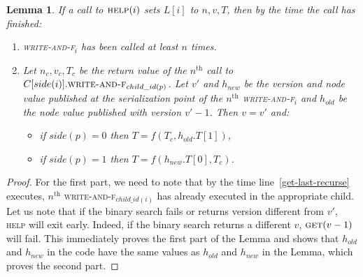 \documentclass[a4paper,11pt]{article}
\newtheorem{lemma}{Lemma}
\newcommand{\fn}[1]{\textsc{#1}}
\begin{document}
\begin{lemma}
	If a call to $\fn{help}(i)$ sets $L[i]$ to $n, v, T$, then by the time the call has finished: \label{last-is-correct}
\begin{enumerate}
	\item \fn{write-and-f$_i$} has been called at least $n$ times.
	\item Let $n_c, v_c, T_c$ be the return value of the $n^{\text{th}}$ call to $C[side(i)].\fn{write-and-f}_{child\_id(p)}$. Let $v'$ and $h_{new}$ be the version and node value published at the serialization point of the $n^{\text{th}}$
		\fn{write-and-f$_i$} and $h_{old}$ be the node value published with version $v'-1$. Then $v = v'$ and:
		\begin{itemize}
			\item if $side(p) = 0$ then $T = f(T_c, h_{old}.T[1])$,
			\item if $side(p) = 1$ then $T = f(h_{new}.T[0], T_c)$.
		\end{itemize}
\end{enumerate}
\end{lemma}
\begin{proof}
	For the first part, we need to note that by the time line~\ref{get-last-recurse} executes, $n^{\text{th}}$ \fn{write-and-f$_{child\_id(i)}$} has already executed in the appropriate child.
	Let us note that if the binary search fails or returns version different from $v'$, \fn{help} will exit early. Indeed, if the binary search returns a different $v$, $\fn{get}(v-1)$ will fail.
	This immediately proves the first part of the Lemma and shows that $h_{old}$ and $h_{new}$ in the code have the same values as $h_{old}$ and $h_{new}$ in the Lemma, which proves the second part.
\end{proof}
\end{document}
